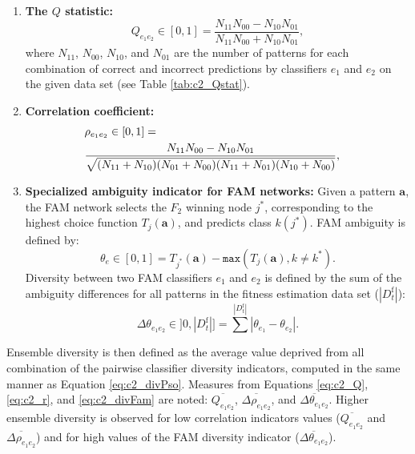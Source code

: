 \begin{enumerate}
	\item \textbf{The $Q$ statistic:}
		\begin{equation} \label{eq:c2_Q}
	    Q_{e_1e_2} \in [0,1] =
	              \frac{N_{11}N_{00}-N_{10}N_{01}}{N_{11}N_{00}+N_{10}N_{01}},
		\end{equation}
where $N_{11}$, $N_{00}$, $N_{10}$, and $N_{01}$ are the number of patterns for each combination of correct and incorrect predictions by classifiers $e_1$ and $e_2$ on the given data set (see Table	\ref{tab:c2_Qstat}).
	\item \textbf{Correlation coefficient:}
\begin{equation}  \label{eq:c2_r}
	\begin{split}
		 \lefteqn{\rho_{e_1e_2} \in [0,1] =}\\
	   & \frac{ N_{11}N_{00} - N_{10}N_{01} }
		{\sqrt{(N_{11}+N_{10})(N_{01}+N_{00})(N_{11}+N_{01})(N_{10}+N_{00}) }},
	\end{split}
\end{equation}
	\item \textbf{Specialized ambiguity indicator for FAM networks:} Given a pattern $\textbf{a}$, the FAM network selects the $F_2$ winning node $j^*$, corresponding to the highest choice function $T_{j}(\textbf{a})$, and predicts class $k(j^*)$. FAM ambiguity is defined by: 
		\begin{equation}
			\theta_e \in[0,1] = T_{j^*}(\textbf{a}) -
			                \texttt{max}(T_{j}(\textbf{a}), k\neq k^*).
		\end{equation}
Diversity between two FAM classifiers $e_1$ and $e_2$ is defined by the sum of the ambiguity differences for all patterns in the fitness estimation data set ($|D_t^\text{f}|$):
		\begin{equation}
			\Delta\theta_{e_1e_2} \in]0,|D_t^\text{f}|] =
	                   \displaystyle\sum^{|D_t^\text{f}|}
	                   |\theta_{e_1}-\theta_{e_2}|.
			\label{eq:c2_divFam}
		\end{equation}
\end{enumerate}

Ensemble diversity is then defined as the average value deprived from all combination of the pairwise classifier diversity indicators, computed in the same manner as Equation \ref{eq:c2_divPso}. 
Measures from Equations \ref{eq:c2_Q}, \ref{eq:c2_r}, and \ref{eq:c2_divFam} are noted: $\overline{Q_{e_1e_2}}$, $\overline{\Delta \rho_{e_1e_2}}$, and $\overline{\Delta \theta_{e_1e_2}}$.
Higher ensemble diversity is observed for low correlation indicators values ($\overline{Q_{e_1e_2}}$ and $\overline{\Delta \rho_{e_1e_2}}$) and for high values of the FAM diversity indicator ($\overline{\Delta \theta_{e_1e_2}}$).

